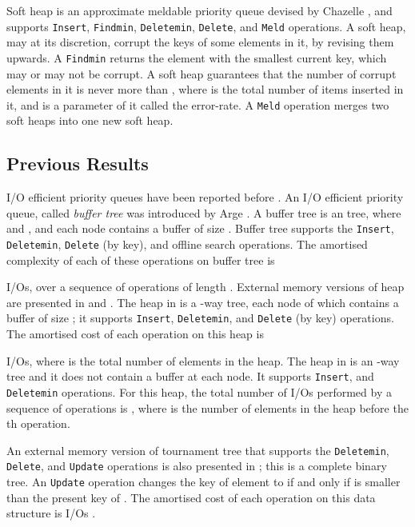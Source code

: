 Soft heap is an approximate meldable priority queue devised
	by Chazelle \cite{Ch00a}, and supports
	{\tt Insert}, {\tt Findmin}, {\tt Deletemin}, {\tt Delete}, and
	{\tt Meld} operations. 
A soft heap, may at its discretion, corrupt the keys of some elements in it, by revising them upwards.
A {\tt Findmin} returns the element with the smallest current key, which may or may not be corrupt. 
A soft heap guarantees that the number of corrupt elements in it is never more than
, where  is the total number of items inserted in it, and  is
a parameter of it called the error-rate.   
A {\tt Meld} operation merges two soft heaps into one new soft heap.

\subsection{Previous Results}
I/O efficient priority queues have been reported before \cite{Arge03,BK98,FJKT99,KS96,MZ03}.
An I/O efficient priority queue, called \emph{buffer tree}  was introduced by 
        Arge \cite{Arge03}.
A buffer tree is an  tree, where  and , and each
        node contains a buffer of size .
Buffer tree supports the {\tt Insert}, {\tt  Deletemin}, {\tt Delete} (by key), 
	and offline search operations.
The amortised complexity of each of these operations on buffer tree is
        
        I/Os, over a sequence of operations of length .
External memory versions of heap are presented in \cite{KS96} and \cite{FJKT99}. 
The heap in \cite{KS96} is a -way tree, each node of which contains a buffer 
of size ; it supports {\tt Insert}, {\tt Deletemin}, and {\tt Delete} (by key) operations.
The amortised cost of each operation on this heap is
        
        I/Os, where  is the total number of
        elements in the heap.
The heap in \cite{FJKT99} is an -way tree and it does not contain a buffer at each node.
It supports {\tt Insert}, and {\tt Deletemin} operations.
For this heap, the total number of I/Os performed by a sequence of 
        operations is , where is the number
        of elements in the heap before the th operation.

An external memory version of tournament tree that supports 
        the {\tt Deletemin}, {\tt Delete}, and {\tt Update}
        operations is also presented in \cite{KS96};
this is a complete binary tree.
An {\tt Update} operation changes the key of element  to 
        if and only if  is smaller than the present key of .
The amortised cost of each operation on this data structure is  I/Os \cite{KS96}.

